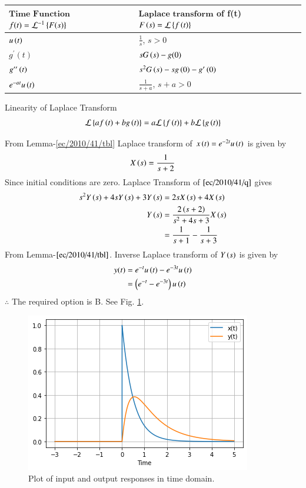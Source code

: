 

\begin{lemma}\label{ec/2010/41/tbl}
\begin{center}
\begin{tabular}{ |m{3cm}|m{4.5cm}| } 
 \hline
 $\textbf{Time Function}$ $f(t)=\mathcal{L}^{-1}\left\{F(s)\right\}$ & $\textbf{Laplace transform}$ of f(t) $F\left(s\right)=\mathcal{L}\left\{f\left(t\right)\right\}$ \\ 
 \hline
 $u\left(t\right)$ & $\frac{1}{s}$, $s>0$ \\ 
 \hline
 $g^{\prime}(t)$ & $sG\left(s\right)-g(0)$ \\ 
 \hline
 $g^{\prime\prime}\left(t\right)$ & $s^2G\left(s\right)-sg\left(0\right)-g^{\prime}\left(0\right)$\\
 \hline
 $e^{-at}u\left(t\right)$ & $\frac{1}{s+a}$, $s+a>0$\\
 \hline
\end{tabular}
\end{center}
\end{lemma}
\begin{lemma}{Linearity of Laplace Transform}
\begin{align}
    \mathcal{L}\left\{af\left(t\right)+bg\left(t\right)\right\}=a\mathcal{L}\left\{f\left(t\right)\right\}+b\mathcal{L}\left\{g\left(t\right)\right\}
\end{align}
\end{lemma}
From Lemma-\ref{ec/2010/41/tbl} Laplace transform of $x\left(t\right)=e^{-2t}u\left(t\right)$ is given by
\begin{align}
    X\left(s\right)=\frac{1}{s+2}
\end{align}
Since initial conditions are zero. Laplace Transform of $\eqref{ec/2010/41/q}$ gives
\begin{align}
    s^{2}Y\left(s\right)+4sY\left(s\right)+3Y\left(s\right)&=2sX\left(s\right)+4X\left(s\right)\\
    Y\left(s\right)&=\frac{2\left(s+2\right)}{s^2+4s+3}X\left(s\right)\\
    &=\frac{1}{s+1}-\frac{1}{s+3}
\end{align}
From Lemma-$\ref{ec/2010/41/tbl}$. Inverse Laplace transform of $Y\left(s\right)$ is given by
\begin{align}
    y(t)&=e^{-t}u\left(t\right)-e^{-3t}u\left(t\right)\\
    &=\left(e^{-t}-e^{-3t}\right)u\left(t\right)
\end{align}
$\therefore$ The required option is B.  See Fig. \ref{ec/2010/41/fig/}.
\
\begin{figure}[!h]
 \centering
 \includegraphics[width=\columnwidth]{solutions/ec/2010/41/figs/plt.png}
 \caption{Plot of input and output responses in time domain.}
 \label{ec/2010/41/fig/}
\end{figure}

